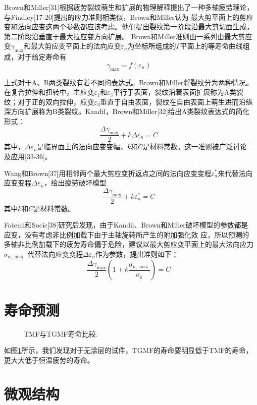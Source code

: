 \documentclass{article}
\begin{document}
Brown和Miller[31]根据疲劳裂纹萌生和扩展的物理解释提出了一种多轴疲劳理论，与Findley[17-20]提出的应力准则相类似，Brown和Miller认为
最大剪平面上的剪应变和法向应变这两个参数都应该考虑。他们提出裂纹第一阶段沿最大剪切面生成，第二阶段沿垂直于最大拉应变方向扩展。
Brown和Miller准则由一系列由最大剪应变${\gamma _{\max }}$和最大剪应变平面上的法向应变${\varepsilon _n}$为坐标所组成的$\Gamma$平面上的等寿命曲线组成，对于给定寿命有
\[{\gamma _{\max }} = f\left( {{\varepsilon _n}} \right)\]

上式对于A、B两类裂纹有着不同的表达式。Brown和Miller将裂纹分为两种情况。在复合拉伸和扭转中，主应变${\varepsilon _1}$和${\varepsilon _3}$平行于表面，裂纹沿着表面扩展称为A类裂纹；对于正的双向拉伸，应变${\varepsilon _3}$垂直于自由表面，裂纹在自由表面上萌生进而沿纵深方向扩展称为B类裂纹。Kandil，Brown和Miller[32]给出A类裂纹表达式的简化形式：
\[\frac{{\Delta {\gamma _{\max }}}}{2} + k\Delta {\varepsilon _n} = C\]
其中，$\Delta {\varepsilon _n}$是临界面上的法向应变变幅，$k$和$C$是材料常数。这一准则被广泛讨论及应用[33-36]。

Wang和Brown[37]用相邻两个最大剪应变折返点之间的法向应变变程${\varepsilon _n^*}$来代替法向应变变程$\Delta {\varepsilon _n}$，给出疲劳破坏模型
\[\frac{{\Delta {\gamma _{\max }}}}{2} + k\varepsilon _n^* = C\]
其中$k$和$C$是材料常数。

Fatemi和Socie[38]研究后发现，由于Kandil、Brown和Miller破坏模型的参数都是应变，没有考虑非比例加载下由于主轴旋转所产生的附加强化效
应，所以预测的多轴非比例加载下的疲劳寿命偏于危险，建议以最大剪应变平面上的最大法向应力${\sigma _{n,\max }}$
代替法向应变变程$\Delta {\varepsilon _n}$作为参数，提出准则如下：
\[\frac{{\Delta {\gamma _{\max }}}}{2}\left( {1 + k\frac{{{\sigma _{n,\max }}}}{{{\sigma _y}}}} \right) = C\]


\section{寿命预测}
\begin{figure}[!htp]
\caption{TMF与TGMF寿命比较.}
\label{Fig:plot_exp_fatigue_life}
\end{figure}
如图\ref{Fig:plot_exp_fatigue_life}所示，我们发现对于无涂层的试件，TGMF的寿命要明显低于TMF的寿命，更大大低于恒温疲劳的寿命。

\section{微观结构}
\end{document}
